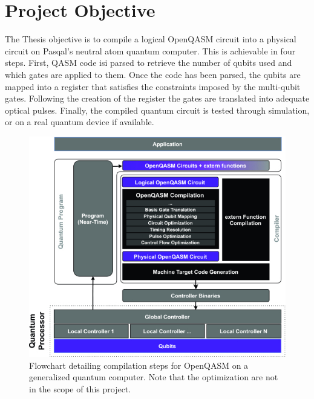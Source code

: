 \section{Project Objective}
\label{sec:objective}

The Thesis objective is to compile a logical OpenQASM circuit into a physical circuit on Pasqal's neutral atom quantum computer. 
This is achievable in four steps. First, QASM code isi parsed to retrieve the number of qubits 
used and which gates are applied to them. Once the code has been parsed, the qubits are mapped into a register that satisfies the constraints imposed by the multi-qubit gates. Following the creation of the register 
the gates are translated into adequate optical pulses. 
Finally, the compiled quantum circuit is tested through simulation, or on a real quantum device if available.
\begin{figure}[H]
    \includegraphics[scale=16]{./Images/compilation_chart.jpg}
    \caption{Flowchart detailing compilation steps for OpenQASM on a generalized quantum computer. Note that the optimization are not in the scope of this project.\cite{crossOpenQASMBroaderDeeper2022}} 
    \label{fig:compchart}
  \end{figure}